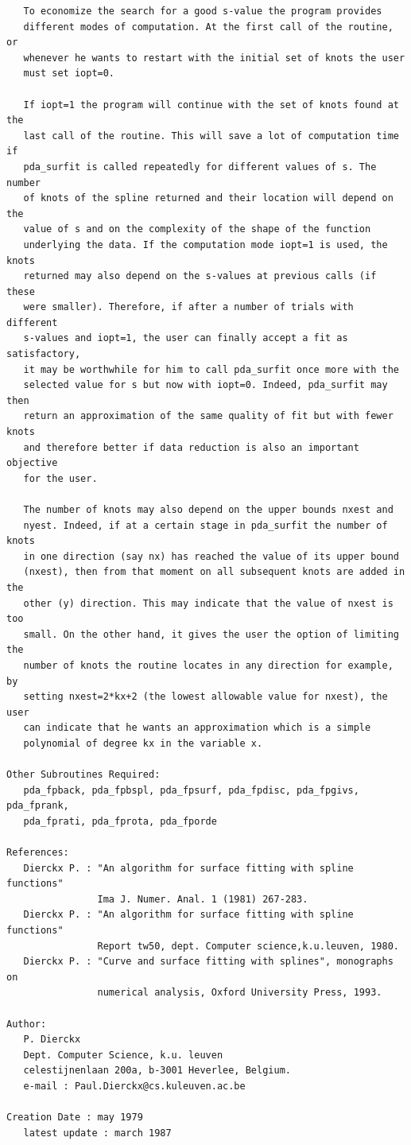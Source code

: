 \documentclass[11pt,twoside]{article}
\begin{document}
\begin{verbatim}
   To economize the search for a good s-value the program provides
   different modes of computation. At the first call of the routine, or
   whenever he wants to restart with the initial set of knots the user
   must set iopt=0.

   If iopt=1 the program will continue with the set of knots found at the
   last call of the routine. This will save a lot of computation time if
   pda_surfit is called repeatedly for different values of s. The number
   of knots of the spline returned and their location will depend on the
   value of s and on the complexity of the shape of the function
   underlying the data. If the computation mode iopt=1 is used, the knots
   returned may also depend on the s-values at previous calls (if these
   were smaller). Therefore, if after a number of trials with different
   s-values and iopt=1, the user can finally accept a fit as satisfactory,
   it may be worthwhile for him to call pda_surfit once more with the
   selected value for s but now with iopt=0. Indeed, pda_surfit may then
   return an approximation of the same quality of fit but with fewer knots
   and therefore better if data reduction is also an important objective
   for the user.

   The number of knots may also depend on the upper bounds nxest and
   nyest. Indeed, if at a certain stage in pda_surfit the number of knots
   in one direction (say nx) has reached the value of its upper bound
   (nxest), then from that moment on all subsequent knots are added in the
   other (y) direction. This may indicate that the value of nxest is too
   small. On the other hand, it gives the user the option of limiting the
   number of knots the routine locates in any direction for example, by
   setting nxest=2*kx+2 (the lowest allowable value for nxest), the user
   can indicate that he wants an approximation which is a simple
   polynomial of degree kx in the variable x.

Other Subroutines Required:
   pda_fpback, pda_fpbspl, pda_fpsurf, pda_fpdisc, pda_fpgivs, pda_fprank, 
   pda_fprati, pda_fprota, pda_fporde

References:
   Dierckx P. : "An algorithm for surface fitting with spline functions"
                Ima J. Numer. Anal. 1 (1981) 267-283.
   Dierckx P. : "An algorithm for surface fitting with spline functions"
                Report tw50, dept. Computer science,k.u.leuven, 1980.
   Dierckx P. : "Curve and surface fitting with splines", monographs on
                numerical analysis, Oxford University Press, 1993.

Author:
   P. Dierckx
   Dept. Computer Science, k.u. leuven
   celestijnenlaan 200a, b-3001 Heverlee, Belgium.
   e-mail : Paul.Dierckx@cs.kuleuven.ac.be

Creation Date : may 1979
   latest update : march 1987
\end{verbatim}
\end{document}
